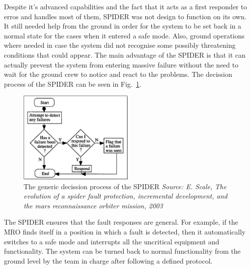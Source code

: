 Despite it's advanced capabilities and the fact that it acts as a first
responder to erros and handles most of them, SPIDER was not design to function
on its own. It still needed help from the ground in order for the system to be
set back in a normal state for the cases when it entered a safe mode. Also,
ground operations where needed in case the system did not recognise some
possibly threatening conditions that could appear. The main advantage of the
SPIDER is that it can actually prevent the system from entering massive failure
without the need to wait for the ground crew to notice and react to the
problems. The decission process of the SPIDER can be seen in
Fig.~\ref{fig:spider}.

\begin{figure}[htb]
	\begin{center}
	\includegraphics[width=0.5\textwidth]{img/spider.png}
	\caption{The generic decission process of the SPIDER\small{\textit{ Source: E.
	Scale, The evolution of a spider fault protection, incremental development, and
	the mars reconnaissance orbiter mission, 2003}}}
	\label{fig:spider}
	\end{center}
\end{figure}


The SPIDER ensures that the fault responses are general. For example, if the MRO
finds itself in a position in which a fault is detected, then it automatically
switches to a safe mode and interrupts all the uncritical equipment and
functionality. The system can be turned back to normal functionality from the
ground level by the team in charge after following a defined protocol.

